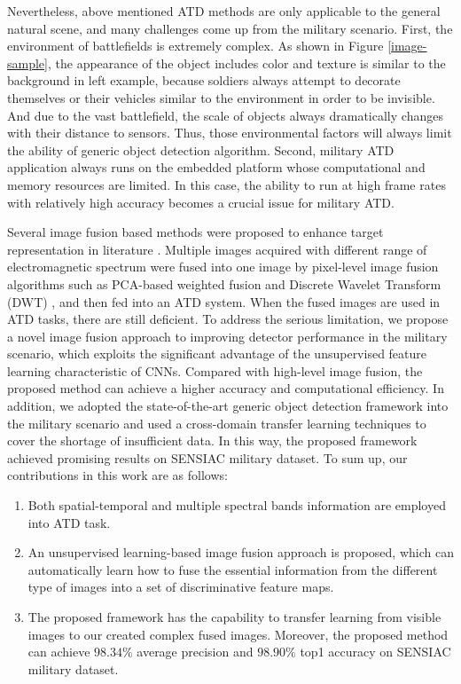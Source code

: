 \documentclass[journal]{IEEEtran}
\begin{document}
Nevertheless, above mentioned ATD methods are only applicable to the general natural scene, and many challenges come up from the military scenario. First, the environment of battlefields is extremely complex. As shown in Figure \ref{image-sample}, the appearance of the object includes color and texture is similar to the background in left example, because soldiers always attempt to decorate themselves or their vehicles similar to the environment in order to be invisible. And due to the vast battlefield, the scale of objects always dramatically changes with their distance to sensors. Thus, those environmental factors will always limit the ability of generic object detection algorithm. Second, military ATD application always runs on the embedded platform whose computational and memory resources are limited. In this case, the ability to run at high frame rates with relatively high accuracy becomes a crucial issue for military ATD.

Several image fusion based methods were proposed to enhance target representation in literature \cite{Bhatnagar2015ASurveillance} \cite{Niu2012AirborneTransform} \cite{Han2007FusionDetection} \cite{Smeelen2014Semi-hiddenImages}. Multiple images acquired with different range of electromagnetic spectrum were fused into one image by pixel-level image fusion algorithms such as PCA-based weighted fusion \cite{Smeelen2014Semi-hiddenImages}and Discrete Wavelet Transform (DWT) \cite{Niu2012AirborneTransform}, and then fed into an ATD system. When the fused images are used in ATD tasks, there are still deficient. To address the serious limitation, we propose a novel image fusion approach to improving detector performance in the military scenario, which exploits the significant advantage of the unsupervised feature learning characteristic of CNNs. Compared with high-level image fusion, the proposed method can achieve a higher accuracy and computational efficiency. In addition, we adopted the state-of-the-art generic object detection framework into the military scenario and used a cross-domain transfer learning techniques to cover the shortage of insufficient data. In this way, the proposed framework achieved promising results on SENSIAC military dataset. 
To sum up, our contributions in this work are as follows:
\begin{enumerate}
\item Both spatial-temporal and multiple spectral bands information are employed into ATD task.
\item An unsupervised learning-based image fusion approach is proposed, which can automatically learn how to fuse the essential information from the different type of images into a set of discriminative feature maps. 
\item The proposed framework has the capability to transfer learning from visible images to our created complex fused images. Moreover, the proposed method can achieve $98.34\%$ average precision and $98.90\%$ top1 accuracy on SENSIAC military dataset.
\end{enumerate}
\end{document}
